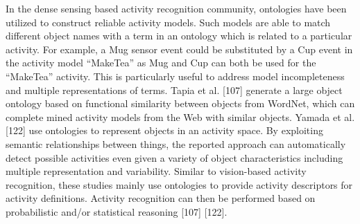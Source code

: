 In the dense sensing based activity recognition community, ontologies have been utilized to construct reliable activity models. Such models are able to match different object names with a term in an ontology which is related to a particular activity. For example, a Mug sensor event could be substituted by a Cup event in the activity model “MakeTea” as Mug and Cup can both be used for the “MakeTea” activity. This is particularly useful to address model incompleteness and multiple representations of terms. Tapia et al. [107] generate a large object ontology based on functional similarity between objects from WordNet, which can complete mined activity models from the Web with similar objects. Yamada et al. [122] use ontologies to represent objects in an activity space. By exploiting semantic relationships between things, the reported approach can automatically detect possible activities even given a variety of object characteristics including multiple representation and variability. Similar to vision-based activity recognition, these studies mainly use ontologies to provide activity descriptors for activity definitions. Activity recognition can then be performed based on probabilistic and/or statistical reasoning [107] [122].

